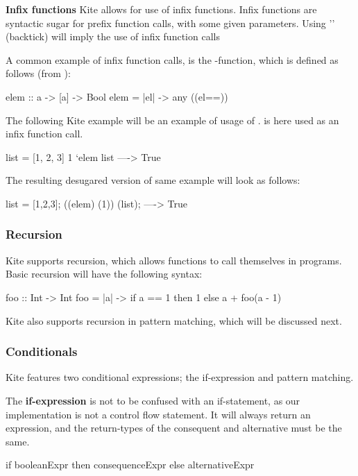 \textbf{Infix functions} Kite allows for use of infix functions. Infix functions are syntactic sugar for prefix function calls, with some given parameters. Using '\code{\`}' (backtick) will imply the use of infix function calls

A common example of infix function calls, is the -function, which is defined as follows (from ):
\begin{kite}
elem :: a -> [a] -> Bool
elem = |el| -> {
  any ((el==))
}
\end{kite}

The following Kite example will be an example of usage of .  is here used as an infix function call.
\begin{kite}
list = [1, 2, 3]
1 `elem list ----> True
\end{kite}
The resulting desugared version of same example will look as follows:

\begin{kite}
list = [1,2,3];
((elem) (1)) (list); ----> True
\end{kite}

\subsubsection{Recursion}
Kite supports recursion, which allows functions to call themselves in programs. Basic recursion will have the following syntax:
\begin{kite}
foo :: Int -> Int
foo = |a| -> {
  if a == 1 then 1
  else a + foo(a - 1)
}
\end{kite}

Kite also supports recursion in pattern matching, which will be discussed next.

\subsubsection{Conditionals}
\label{subsubsec:conditionals}
Kite features two conditional expressions; the if-expression and pattern matching.

The \textbf{if-expression} is not to be confused with an if-statement, as our implementation is not a control flow statement. It will always return an expression, and the return-types of the consequent and alternative must be the same.

\begin{kite}
if booleanExpr then consequenceExpr else alternativeExpr
\end{kite}

